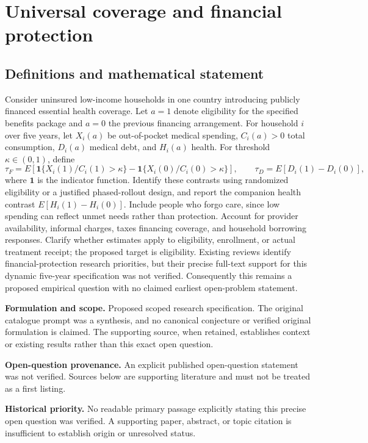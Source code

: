 \documentclass[11pt]{article}
\begin{document}
\section*{Universal coverage and financial protection}\label{30007731}
\subsection{Definitions and mathematical statement}
Consider uninsured low-income households in one country introducing publicly financed essential health coverage. Let \(a=1\) denote eligibility for the specified benefits package and \(a=0\) the previous financing arrangement. For household \(i\) over five years, let \(X_i(a)\) be out-of-pocket medical spending, \(C_i(a)>0\) total consumption, \(D_i(a)\) medical debt, and \(H_i(a)\) health. For threshold \(\kappa\in(0,1)\), define
\[\tau_F=E[\mathbf1\{X_i(1)/C_i(1)>\kappa\}-\mathbf1\{X_i(0)/C_i(0)>\kappa\}],\qquad\tau_D=E[D_i(1)-D_i(0)],\]
where \(\mathbf1\) is the indicator function. Identify these contrasts using randomized eligibility or a justified phased-rollout design, and report the companion health contrast \(E[H_i(1)-H_i(0)]\). Include people who forgo care, since low spending can reflect unmet needs rather than protection. Account for provider availability, informal charges, taxes financing coverage, and household borrowing responses. Clarify whether estimates apply to eligibility, enrollment, or actual treatment receipt; the proposed target is eligibility. Existing reviews identify financial-protection research priorities, but their precise full-text support for this dynamic five-year specification was not verified. Consequently this remains a proposed empirical question with no claimed earliest open-problem statement.

\par\textbf{Formulation and scope.} Proposed scoped research specification. The original catalogue prompt was a synthesis, and no canonical conjecture or verified original formulation is claimed. The supporting source, when retained, establishes context or existing results rather than this exact open question.

\par\textbf{Open-question provenance.} An explicit published open-question statement was not verified. Sources below are supporting literature and must not be treated as a first listing.

\par\textbf{Historical priority.} No readable primary passage explicitly stating this precise open question was verified. A supporting paper, abstract, or topic citation is insufficient to establish origin or unresolved status.
\end{document}
